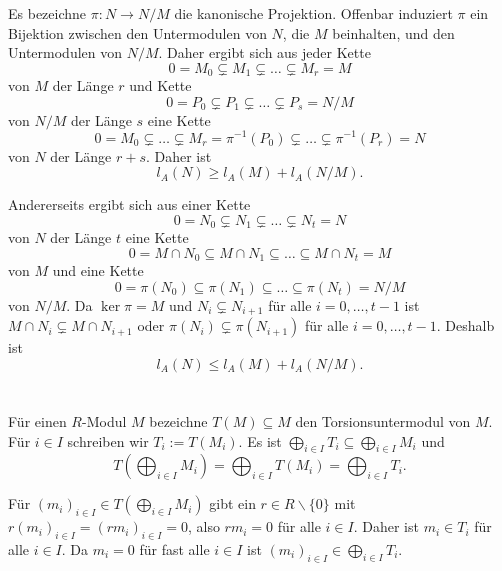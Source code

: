\documentclass[a4paper,10pt]{article}
\theoremstyle{definition}
\begin{document}
Es bezeichne $\pi : N \rightarrow N/M$ die kanonische Projektion. Offenbar induziert $\pi$ ein Bijektion zwischen den Untermodulen von $N$, die $M$ beinhalten, und den Untermodulen von $N/M$. Daher ergibt sich aus jeder Kette
\[
 0 = M_0 \subsetneq M_1 \subsetneq \ldots \subsetneq M_r = M
\]
von $M$ der Länge $r$ und Kette
\[
 0 = P_0 \subsetneq P_1 \subsetneq \ldots \subsetneq P_s = N/M
\]
von $N/M$ der Länge $s$ eine Kette
\[
 0 = M_0 \subsetneq \ldots \subsetneq M_r = \pi^{-1}(P_0) \subsetneq \ldots \subsetneq \pi^{-1}(P_r) = N
\]
von $N$ der Länge $r+s$. Daher ist
\[
 l_A(N) \geq l_A(M) + l_A(N/M).
\]

Andererseits ergibt sich aus einer Kette
\[
 0 = N_0 \subsetneq N_1 \subsetneq \ldots \subsetneq N_t = N
\]
von $N$ der Länge $t$ eine Kette
\[
 0 = M \cap N_0 \subseteq M \cap N_1 \subseteq \ldots \subseteq M \cap N_t = M
\]
von $M$ und eine Kette
\[
 0 = \pi(N_0) \subseteq \pi(N_1) \subseteq \ldots \subseteq \pi(N_t) = N/M
\]
von $N/M$. Da $\ker \pi = M$ und $N_i \subsetneq N_{i+1}$ für alle $i=0, \ldots, t-1$ ist $M \cap N_i \subsetneq M \cap N_{i+1}$ oder $\pi(N_i) \subsetneq \pi(N_{i+1})$ für alle $i=0, \ldots, t-1$. Deshalb ist
\[
 l_A(N) \leq l_A(M) + l_A(N/M).
\]





\section{}





\section{}


\subsection{}
Für einen $R$-Modul $M$ bezeichne $T(M) \subseteq M$ den Torsionsuntermodul von $M$. Für $i \in I$ schreiben wir $T_i := T(M_i)$. Es ist $\bigoplus_{i \in I} T_i \subseteq \bigoplus_{i \in I} M_i$ und
\[
 T\left( \bigoplus_{i \in I} M_i \right) = \bigoplus_{i \in I} T(M_i) = \bigoplus_{i \in I} T_i.
\]

Für $(m_i)_{i \in I} \in T\left( \bigoplus_{i \in I} M_i \right)$ gibt ein $r \in R \smallsetminus \{0\}$ mit $r(m_i)_{i \in I} = (rm_{i})_{i \in I} = 0$, also $rm_i = 0$ für alle $i \in I$. Daher ist $m_i \in T_i$ für alle $i \in I$. Da $m_i = 0$ für fast alle $i \in I$ ist $(m_i)_{i \in I} \in \bigoplus_{i \in I} T_i$.
\end{document}
